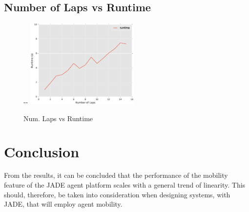 \documentclass[11pt,titlepage]{article}
\newlength{\offsetpage}
\newenvironment{widepage}{
	\begin{adjustwidth}{-\offsetpage}{-\offsetpage}%
    \addtolength{\textwidth}{2\offsetpage}}%
	{\end{adjustwidth}
}
\begin{document}
\subsection{Number of Laps vs Runtime}
\begin{figure}[H]
	\begin{widepage}
		\centering
		\includegraphics[width=0.5\textwidth]{laps.eps}
	\end{widepage}
	\caption{Num. Laps vs Runtime}
	\label{fig:Laps-Runtime}
\end{figure}

\section{Conclusion}

From the results, it can be concluded that the performance of the mobility feature of the JADE agent platform scales with a general trend of linearity. This should, therefore, be taken into consideration when designing systems, with JADE, that will employ agent mobility.

%
%
\end{document}
